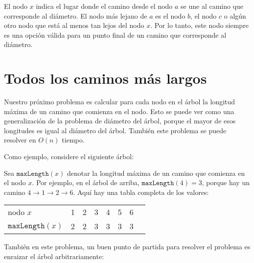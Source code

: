 El nodo $x$ indica el lugar donde el camino
desde el nodo $a$ se une al camino que corresponde
al diámetro.
El nodo más lejano de $a$
es el nodo $b$, el nodo $c$ o algún otro nodo
que está al menos tan lejos del nodo $x$.
Por lo tanto, este nodo siempre es una opción válida para
un punto final de un camino que corresponde al diámetro.

\section{Todos los caminos más largos}

Nuestro próximo problema es calcular para cada nodo
en el árbol la longitud máxima de un camino
que comienza en el nodo.
Esto se puede ver como una generalización de la
problema de diámetro del árbol, porque el mayor de esos
longitudes es igual al diámetro del árbol.
También este problema se puede resolver en $O(n)$ tiempo.

Como ejemplo, considere el siguiente árbol:
\begin{center}
\end{center}

Sea $\texttt{maxLength}(x)$ denotar la longitud máxima
de un camino que comienza en el nodo $x$.
Por ejemplo, en el árbol de arriba,
$\texttt{maxLength}(4)=3$, porque hay
un camino $4 \rightarrow 1 \rightarrow 2 \rightarrow 6$.
Aquí hay una tabla completa de los valores:
\begin{center}
\begin{tabular}{l|lllllll}
nodo $x$ & 1 & 2 & 3 & 4 & 5 & 6 \\
$\texttt{maxLength}(x)$ & 2 & 2 & 3 & 3 & 3 & 3 \\
\end{tabular}
\end{center}

También en este problema, un buen punto de partida
para resolver el problema es enraizar el árbol arbitrariamente:
\begin{center}
\end{center}

